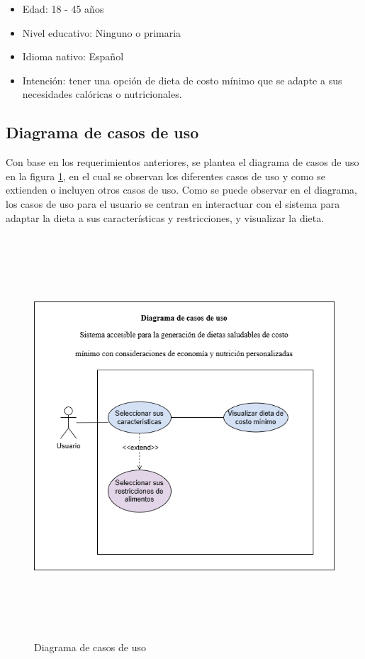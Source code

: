 \begin{itemize}
    \item Edad: 18 - 45 a\~nos
    \item Nivel educativo: Ninguno o primaria
    \item Idioma nativo: Espa\~nol
    \item Intenci\'on: tener una opci\'on de dieta de costo m\'inimo que se adapte a sus necesidades cal\'oricas o nutricionales.
\end{itemize}


\newpage
\subsection{Diagrama de casos de uso}

\noindent Con base en los requerimientos anteriores, se plantea el diagrama de casos de uso en la figura \ref{fig:casosDiagrama}, en el cual se observan los diferentes casos de uso y como se extienden o incluyen otros casos de uso. Como se puede observar en el diagrama, los casos de uso para el usuario se centran en interactuar con el sistema para adaptar la dieta a sus caracter\'isticas y restricciones, y visualizar la dieta.


\begin{figure}[H]
        \centering
        \includegraphics[height=15cm]{img/Diseno/casos de uso.png}
        \caption{Diagrama de casos de uso}
        \label{fig:casosDiagrama}
    \end{figure}



